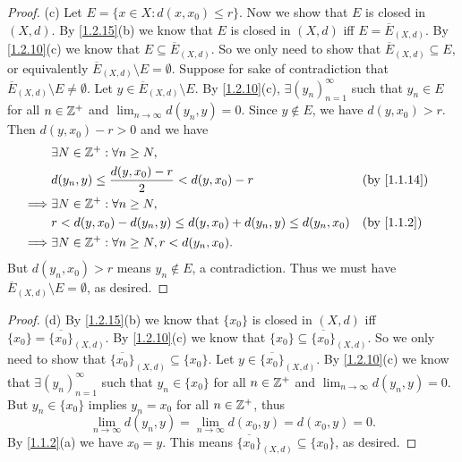 \begin{proof}{(c)}
  Let \(E = \{x \in X : d(x, x_0) \leq r\}\).
  Now we show that \(E\) is closed in \((X, d)\).
  By \cref{1.2.15}(b) we know that \(E\) is closed in \((X, d)\) iff \(E = \overline{E}_{(X, d)}\).
  By \cref{1.2.10}(c) we know that \(E \subseteq \overline{E}_{(X, d)}\).
  So we only need to show that \(\overline{E}_{(X, d)} \subseteq E\), or equivalently \(\overline{E}_{(X, d)} \setminus E = \emptyset\).
  Suppose for sake of contradiction that \(\overline{E}_{(X, d)} \setminus E \neq \emptyset\).
  Let \(y \in \overline{E}_{(X, d)} \setminus E\).
  By \cref{1.2.10}(c), \(\exists (y_n)_{n = 1}^\infty\) such that \(y_n \in E\) for all \(n \in \mathbb{Z}^+\) and \(\lim_{n \to \infty} d(y_n, y) = 0\).
  Since \(y \notin E\), we have \(d(y, x_0) > r\).
  Then \(d(y, x_0) - r > 0\) and we have
  \begin{align*}
             & \exists N \in \Z^+ : \forall n \geq N,                                                 \\
             & d(y_n, y) \leq \dfrac{d(y, x_0) - r}{2} < d(y, x_0) - r               &  & \by{1.1.14} \\
    \implies & \exists N \in \Z^+ : \forall n \geq N,                                                 \\
             & r < d(y, x_0) - d(y_n, y) \leq d(y, x_0) + d(y_n, y) \leq d(y_n, x_0) &  & \by{1.1.2}  \\
    \implies & \exists N \in \Z^+ : \forall n \geq N, r < d(y_n, x_0).
  \end{align*}
  But \(d(y_n, x_0) > r\) means \(y_n \notin E\), a contradiction.
  Thus we must have \(\overline{E}_{(X, d)} \setminus E = \emptyset\), as desired.
\end{proof}

\begin{proof}{(d)}
  By \cref{1.2.15}(b) we know that \(\{x_0\}\) is closed in \((X, d)\) iff \(\{x_0\} = \overline{\{x_0\}}_{(X, d)}\).
  By \cref{1.2.10}(c) we know that \(\{x_0\} \subseteq \overline{\{x_0\}}_{(X, d)}\).
  So we only need to show that \(\overline{\{x_0\}}_{(X, d)} \subseteq \{x_0\}\).
  Let \(y \in \overline{\{x_0\}}_{(X, d)}\).
  By \cref{1.2.10}(c) we know that \(\exists (y_n)_{n = 1}^\infty\) such that \(y_n \in \{x_0\}\) for all \(n \in \mathbb{Z}^+\) and \(\lim_{n \to \infty} d(y_n, y) = 0\).
  But \(y_n \in \{x_0\}\) implies \(y_n = x_0\) for all \(n \in \mathbb{Z}^+\), thus
  \[
    \lim_{n \to \infty} d(y_n, y) = \lim_{n \to \infty} d(x_0, y) = d(x_0, y) = 0.
  \]
  By \cref{1.1.2}(a) we have \(x_0 = y\).
  This means \(\overline{\{x_0\}}_{(X, d)} \subseteq \{x_0\}\), as desired.
\end{proof}

